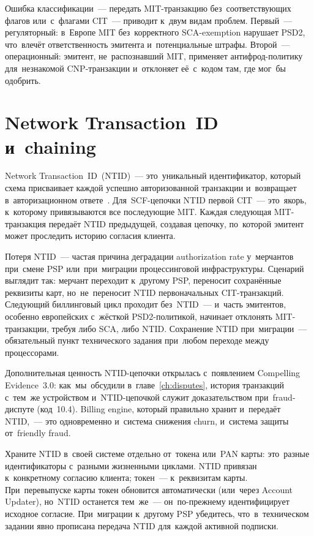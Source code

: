 Ошибка классификации~--- передать MIT-транзакцию без~соответствующих
флагов или~с~флагами CIT~--- приводит к~двум видам проблем. Первый~---
регуляторный: в~Европе MIT без~корректного SCA-exemption нарушает PSD2,
что~влечёт ответственность эмитента и~потенциальные штрафы. Второй~---
операционный: эмитент, не~распознавший MIT, применяет антифрод-политику
для~незнакомой CNP-транзакции и~отклоняет её~с~кодом  там, где
мог~бы одобрить.


\section{Network Transaction~ID и~chaining}
\label{sec:subscriptions-ntid}

Network Transaction~ID~(NTID)~--- это~уникальный идентификатор, который
схема присваивает каждой успешно авторизованной транзакции и~возвращает
в~авторизационном ответе~. Для~SCF-цепочки NTID первой
CIT~--- это~якорь, к~которому привязываются все последующие MIT. Каждая
следующая MIT-транзакция передаёт NTID предыдущей, создавая цепочку,
по~которой эмитент может проследить историю согласия клиента.

Потеря NTID~--- частая причина деградации authorization rate у~мерчантов
при~смене PSP или~при~миграции процессинговой инфраструктуры. Сценарий
выглядит так: мерчант переходит к~другому PSP, переносит сохранённые
реквизиты карт, но~не~переносит NTID первоначальных CIT-транзакций.
Следующий биллинговый цикл проходит без~NTID~--- и~часть эмитентов,
особенно европейских с~жёсткой PSD2-политикой, начинает отклонять
MIT-транзакции, требуя либо SCA, либо NTID. Сохранение NTID при~миграции~---
обязательный пункт технического задания при~любом переходе между
процессорами.

Дополнительная ценность NTID-цепочки открылась с~появлением Compelling
Evidence~3.0: как~мы~обсудили в~главе~\ref{ch:disputes}, история транзакций
с~тем~же устройством и~NTID-цепочкой служит доказательством при~fraud-диспуте
(код~10.4). Billing engine, который правильно хранит и~передаёт NTID,~---
это одновременно и~система снижения churn, и~система защиты от~friendly
fraud.

\begin{practice}
  Храните NTID в~своей системе отдельно от~токена или~PAN карты:
  это~разные идентификаторы с~разными жизненными циклами. NTID привязан
  к~конкретному согласию клиента; токен~--- к~реквизитам карты. При~перевыпуске
  карты токен обновится автоматически (или~через Account Updater), но~NTID
  останется тем~же~--- он~по-прежнему идентифицирует исходное согласие.
  При~миграции к~другому PSP убедитесь, что~в~техническом задании явно
  прописана передача NTID для~каждой активной подписки.
\end{practice}


